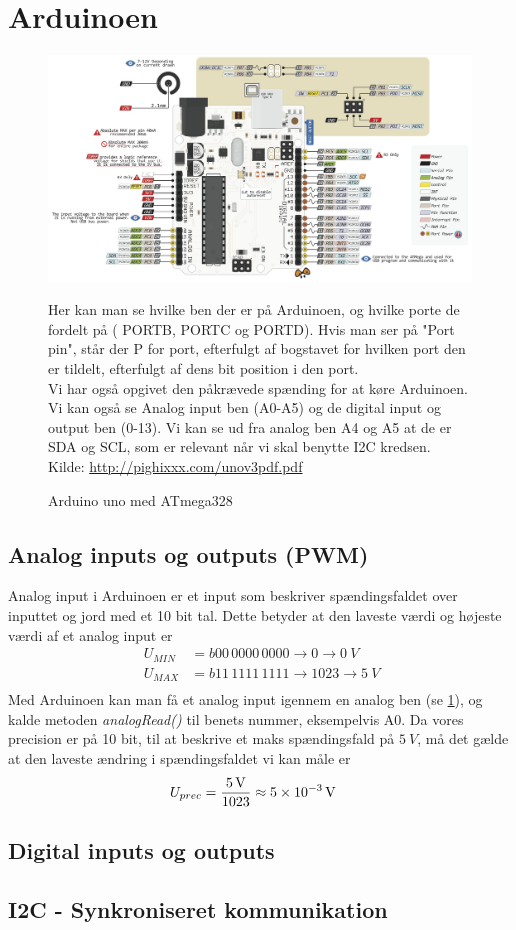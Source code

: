 \section{Arduinoen} \label{sec:arduino}
\begin{figure}[H]
	\centering
    \includegraphics[width=\textwidth]{figures/arduino/portmani.PNG}
	\caption{Arduino uno med ATmega328}
	\label{fig:portmani}
	Her kan man se hvilke ben der er på Arduinoen, og hvilke porte de fordelt på ( PORTB, PORTC og PORTD). Hvis man ser på "Port pin", står der P for port, efterfulgt af bogstavet for hvilken port den er tildelt, efterfulgt af dens bit position i den port.\\
	Vi har også opgivet den påkrævede spænding for at køre Arduinoen. Vi kan også se Analog input ben (A0-A5) og de digital input og output ben (0-13). Vi kan se ud fra analog ben A4 og A5 at de er SDA og SCL, som er relevant når vi skal benytte I2C kredsen.
	\\Kilde: \url{http://pighixxx.com/unov3pdf.pdf}
\end{figure}
\subsection{Analog inputs og outputs (PWM)}\label{sec:ard:analog}
Analog input i Arduinoen er et input som beskriver spændingsfaldet over inputtet og jord med et 10 bit tal.\cite{arduinoAnalog} Dette betyder at den laveste værdi og højeste værdi af et analog input er
\begin{align}
\SI{}{U_{MIN}}&=b00\,0000\,0000\rightarrow 0\rightarrow \SI{0}{V}\\
\SI{}{U_{MAX}}&=b11\,1111\,1111\rightarrow 1023\rightarrow \SI{5}{V}\\
\end{align}
Med Arduinoen kan man få et analog input igennem en analog ben (se \ref{fig:portmani}), og kalde metoden \emph{analogRead()} til benets nummer, eksempelvis A0. Da vores precision er på 10 bit, til at beskrive et maks spændingsfald på $\SI{5}{V}$, må det gælde at den laveste ændring i spændingsfaldet vi kan måle er
\begin{align}
U_{prec}&=\frac{\SI{5}{V}}{1023}\approx \SI{5d-3}{V}
\end{align}
\subsection{Digital inputs og outputs}
\subsection{I2C - Synkroniseret kommunikation}